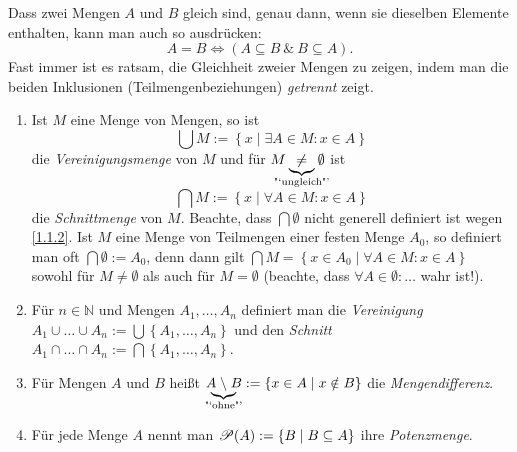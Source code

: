 \documentclass[../../main.tex]{subfiles}
\begin{document}
\begin{bem}\label{1.1.13}
Dass zwei Mengen $A$ und $B$ gleich sind, genau dann, wenn sie dieselben Elemente enthalten, kann man auch so ausdrücken:
\[A=B\iff (A\subseteq B ~\&~ B\subseteq A).\] Fast immer ist es ratsam, die Gleichheit zweier Mengen zu zeigen, indem man die beiden Inklusionen (Teilmengenbeziehungen) \emph{getrennt} zeigt.
\end{bem}

\begin{df}\label{1.1.14}
\begin{enumerate}[\normalfont(a)]
\item Ist $M$ eine Menge von Mengen, so ist
$$\bigcup M:=\left\{x \mid \exists A\in M: x\in A\right\}$$
die \emph{Vereinigungsmenge} von $M$ und für
$M\hspace{-1em}\underbrace\neq_{\text{"`ungleich"'}}\hspace{-1em}\emptyset$ ist
$$\bigcap M:=\left\{x\mid \forall A\in M : x\in A\right\}$$
die \emph{Schnittmenge} von $M$. Beachte, dass $\bigcap \emptyset$ nicht generell definiert ist wegen \ref{1.1.2}. Ist $M$ eine Menge von Teilmengen einer festen Menge $A_0$, so definiert man oft $\bigcap \emptyset:=A_0$, denn dann gilt $\bigcap M=\left\{x\in A_0\mid \forall A\in M: x\in A\right\}$ sowohl für $M\neq \emptyset$ als auch für $M=\emptyset$ (beachte, dass $\forall A\in\emptyset:\ldots$ wahr ist!).
\item Für $n\in\mathbb{N}$ und Mengen $A_1,\ldots,A_n$ definiert man die \emph{Vereinigung} $A_1\cup\ldots\cup A_n:=\bigcup\left\{A_1,\ldots,A_n\right\}$ und den \emph{Schnitt} $A_1\cap\ldots\cap A_n:=\bigcap \left\{A_1,\ldots,A_n\right\}$.
\item Für Mengen $A$ und $B$ heißt $A\hspace{-1em}\underbrace\setminus_{\text{"`ohne"'}}\hspace{-1em}B:=\left\{x\in A\mid x\notin B\right\}$ die \emph{Mengendifferenz}.
\item Für jede Menge $A$ nennt man $\mathcal P(A):=\left\{B\mid B\subseteq A\right\}$ ihre \emph{Potenzmenge}.
\end{enumerate}
\end{df}
\end{document}
